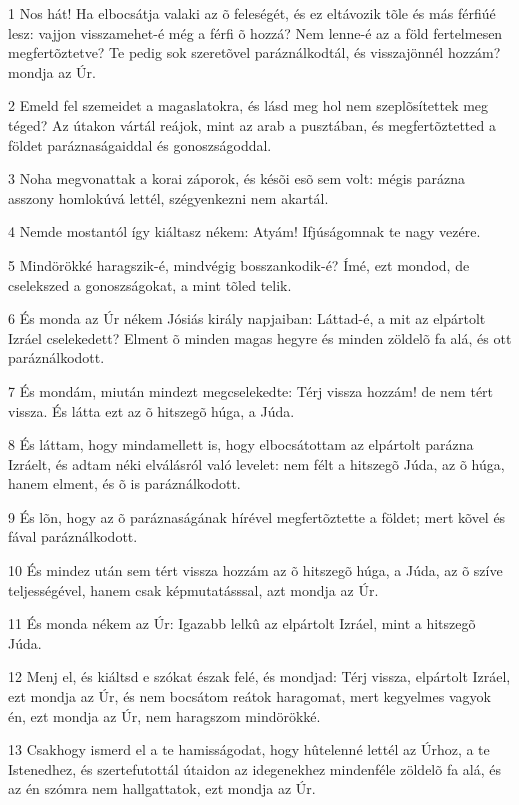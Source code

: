 \par 1 Nos hát! Ha elbocsátja valaki az õ feleségét, és ez eltávozik tõle és más férfiúé lesz: vajjon visszamehet-é még a férfi õ hozzá? Nem lenne-é az a föld fertelmesen megfertõztetve? Te pedig sok szeretõvel paráználkodtál, és visszajönnél hozzám? mondja az Úr.
\par 2 Emeld fel szemeidet a magaslatokra, és lásd meg hol nem szeplõsítettek meg téged? Az útakon vártál reájok, mint az arab a pusztában, és megfertõztetted a földet paráznaságaiddal és gonoszságoddal.
\par 3 Noha megvonattak a korai záporok, és késõi esõ sem volt: mégis parázna asszony homlokúvá lettél, szégyenkezni nem akartál.
\par 4 Nemde mostantól így kiáltasz nékem: Atyám! Ifjúságomnak te nagy vezére.
\par 5 Mindörökké haragszik-é, mindvégig bosszankodik-é? Ímé, ezt mondod, de cselekszed a gonoszságokat, a mint tõled telik.
\par 6 És monda az Úr nékem Jósiás király napjaiban: Láttad-é, a mit az elpártolt Izráel cselekedett? Elment õ minden magas hegyre és minden zöldelõ fa alá, és ott paráználkodott.
\par 7 És mondám, miután mindezt megcselekedte: Térj vissza hozzám! de nem tért vissza. És látta ezt az õ hitszegõ húga, a Júda.
\par 8 És láttam, hogy mindamellett is, hogy elbocsátottam az elpártolt parázna Izráelt, és adtam néki elválásról való levelet: nem félt a hitszegõ Júda, az õ húga, hanem elment, és õ is paráználkodott.
\par 9 És lõn, hogy az õ paráznaságának hírével megfertõztette a földet; mert kõvel és fával paráználkodott.
\par 10 És mindez után sem tért vissza hozzám az õ hitszegõ húga, a Júda, az õ szíve teljességével, hanem csak képmutatásssal, azt mondja az Úr.
\par 11 És monda nékem az Úr: Igazabb lelkû az elpártolt Izráel, mint a hitszegõ Júda.
\par 12 Menj el, és kiáltsd e szókat észak felé, és mondjad: Térj vissza, elpártolt Izráel, ezt mondja az Úr, és nem bocsátom reátok haragomat, mert kegyelmes vagyok én, ezt mondja az Úr, nem haragszom mindörökké.
\par 13 Csakhogy ismerd el a te hamisságodat, hogy hûtelenné lettél az Úrhoz, a te Istenedhez, és szertefutottál útaidon az idegenekhez mindenféle zöldelõ fa alá, és az én szómra nem hallgattatok, ezt mondja az Úr.
